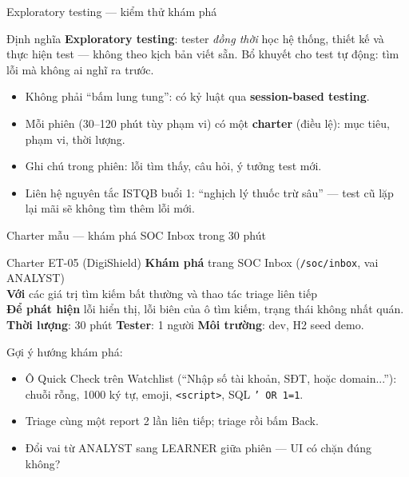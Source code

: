 \documentclass[aspectratio=169,12pt]{beamer}
\begin{document}
\begin{frame}{Exploratory testing --- kiểm thử khám phá}
  \begin{block}{Định nghĩa}
    \textbf{Exploratory testing}: tester \emph{đồng thời} học hệ thống, thiết kế và thực hiện test --- không theo kịch bản viết sẵn. Bổ khuyết cho test tự động: tìm lỗi mà không ai nghĩ ra trước.
  \end{block}
  \begin{itemize}
    \item Không phải ``bấm lung tung'': có kỷ luật qua \textbf{session-based testing}.
    \item Mỗi phiên (30--120 phút tùy phạm vi) có một \textbf{charter} (điều lệ): mục tiêu, phạm vi, thời lượng.
    \item Ghi chú trong phiên: lỗi tìm thấy, câu hỏi, ý tưởng test mới.
    \item Liên hệ nguyên tắc ISTQB buổi 1: ``nghịch lý thuốc trừ sâu'' --- test cũ lặp lại mãi sẽ không tìm thêm lỗi mới.
  \end{itemize}
\end{frame}

\begin{frame}{Charter mẫu --- khám phá SOC Inbox trong 30 phút}
  \begin{exampleblock}{Charter ET-05 (DigiShield)}
    \small
    \textbf{Khám phá} trang SOC Inbox (\texttt{/soc/inbox}, vai ANALYST)\\
    \textbf{Với} các giá trị tìm kiếm bất thường và thao tác triage liên tiếp\\
    \textbf{Để phát hiện} lỗi hiển thị, lỗi biên của ô tìm kiếm, trạng thái không nhất quán.\\[0.4em]
    \textbf{Thời lượng}: 30 phút \quad \textbf{Tester}: 1 người \quad \textbf{Môi trường}: dev, H2 seed demo.
  \end{exampleblock}
  \small Gợi ý hướng khám phá:
  \begin{itemize}
    \item Ô Quick Check trên Watchlist (``Nhập số tài khoản, SĐT, hoặc domain...''): chuỗi rỗng, 1000 ký tự, emoji, \texttt{<script>}, SQL \texttt{' OR 1=1}.
    \item Triage cùng một report 2 lần liên tiếp; triage rồi bấm Back.
    \item Đổi vai từ ANALYST sang LEARNER giữa phiên --- UI có chặn đúng không?
  \end{itemize}
\end{frame}
\end{document}
